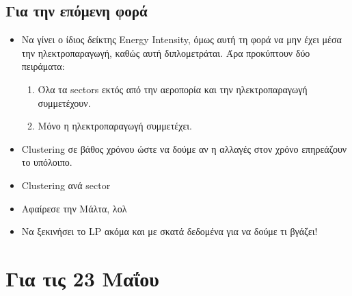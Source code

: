 \documentclass[a4paper,twoside,10pt]{article}
\begin{document}
\subsection{Για την επόμενη φορά}
\begin{itemize}
	\item Να γίνει ο ίδιος δείκτης Energy Intensity, όμως αυτή τη φορά να μην έχει μέσα την ηλεκτροπαραγωγή, καθώς αυτή διπλομετράται. Άρα προκύπτουν δύο πειράματα:
	\begin{enumerate}
		\item Όλα τα sectors εκτός από την αεροπορία και την ηλεκτροπαραγωγή συμμετέχουν.
		\item Μόνο η ηλεκτροπαραγωγή συμμετέχει.
	\end{enumerate}
	\item Clustering σε βάθος χρόνου ώστε να δούμε αν η αλλαγές στον χρόνο επηρεάζουν το υπόλοιπο. 
	\item Clustering ανά sector 
	\item Αφαίρεσε την Μάλτα, λολ
	\item Να ξεκινήσει το LP ακόμα και με σκατά δεδομένα για να δούμε τι βγάζει!
\end{itemize}

\section{Για τις 23 Μαΐου}
\end{document}

